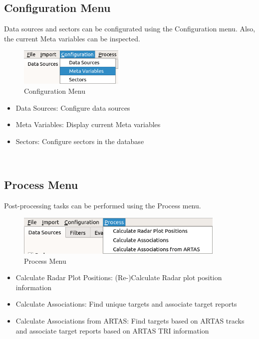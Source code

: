 \subsection{Configuration Menu}

Data sources and sectors can be configurated using the Configuration menu. Also, the current Meta variables can be inspected.

\begin{figure}[H]
  \center
    \includegraphics[width=5cm,frame]{figures/ui_configuration_menu.png}
  \caption{Configuration Menu}
\end{figure}

\begin{itemize}
 \item Data Sources: Configure data sources
 \item Meta Variables: Display current Meta variables
 \item Sectors: Configure sectors in the database
\end{itemize}
\  \\

\subsection{Process Menu}

Post-processing tasks can be performed using the Process menu.

\begin{figure}[H]
  \center
    \includegraphics[width=10cm,frame]{figures/ui_process_menu.png}
  \caption{Process Menu}
\end{figure}

\begin{itemize}
 \item Calculate Radar Plot Positions: (Re-)Calculate Radar plot position information
 \item Calculate Associations: Find unique targets and associate target reports
 \item Calculate Associations from ARTAS: Find targets based on ARTAS tracks and associate target reports based on ARTAS TRI information
\end{itemize}
\  \\

